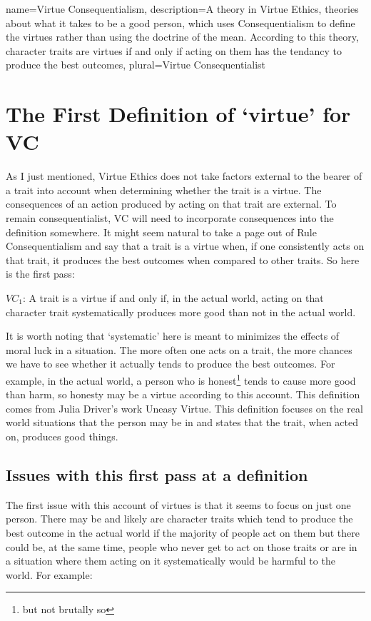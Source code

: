 {
  name=Virtue Consequentialism,
  description={A theory in Virtue Ethics, theories about what it takes to be a good person, which uses Consequentialism to define the virtues rather than using the doctrine of the mean. According to this theory, character traits are virtues if and only if acting on them has the tendancy to produce the best outcomes},
  plural=Virtue Consequentialist
}


\section{The First Definition of ‘virtue’ for VC}

As I just mentioned, Virtue Ethics does not take factors external to the bearer of a trait into account when determining whether the trait is a virtue. The consequences of an action produced by acting on that trait are external.  To remain consequentialist, VC will need to incorporate consequences into the definition somewhere. It might seem natural to take a page out of Rule Consequentialism and say that a trait is a virtue when, if one consistently acts on that trait, it produces the best outcomes when compared to other traits. So here is the first pass:
\begin{center}
$VC_1$: A trait is a virtue if and only if, in the actual world, acting on that character trait systematically produces more good than not in the actual world.
\end{center}
It is worth noting that ‘systematic’ here is meant to minimizes the effects of moral luck in a situation. The more often one acts on a trait, the more chances we have to see whether it actually tends to produce the best outcomes. For example, in the actual world, a person who is honest\footnote{but not brutally so} tends to cause more good than harm, so honesty may be a virtue according to this account. This definition comes from Julia Driver’s work Uneasy Virtue.\autocite{Driver1} This definition focuses on the real world situations that the person may be in and states that the trait, when acted on, produces good things.

\subsection{Issues with this first pass at a definition}
The first issue with this account of virtues is that it seems to focus on just one person. There may be and likely are character traits which tend to produce the best outcome in the actual world if the majority of people act on them but there could be, at the same time, people who never get to act on those traits or are in a situation where them acting on it systematically would be harmful to the world. For example:

